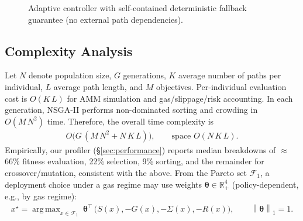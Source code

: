 \documentclass[11pt]{article}
\DeclareMathOperator*{\argmax}{arg\,max}
\newcommand{\R}{\mathbb{R}}
\newcommand{\1}{\mathbf{1}}  %
\newcommand{\norm}[1]{\left\lVert #1\right\rVert}
\begin{document}
\begin{figure}[t]
\centering
{}
\caption{Adaptive controller with self-contained deterministic fallback guarantee (no external path dependencies).}
\label{alg:hybrid}
\end{figure}

\subsection{Complexity Analysis}
Let $N$ denote population size, $G$ generations, $K$ average number of paths per individual, $L$ average path length, and $M$ objectives. Per-individual evaluation cost is $O(K\,L)$ for AMM simulation and gas/slippage/risk accounting. In each generation, NSGA-II performs non-dominated sorting and crowding in $O(M\,N^2)$ time. Therefore, the overall time complexity is
\begin{align}
  O\big(G\,(M\,N^2 + N\,K\,L)\big),\qquad \text{space } O(N\,K\,L).
\end{align}
Empirically, our profiler (\S\ref{sec:performance}) reports median breakdowns of $\approx$66\% fitness evaluation, 22\% selection, 9\% sorting, and the remainder for crossover/mutation, consistent with the above.
\;From the Pareto set $\mathcal{F}_1$, a deployment choice under a gas regime may use weights $\bm{\theta}\in\R_+^4$ (policy-dependent, e.g., by gas regime):
\begin{align}
 x^{\star} = \argmax_{x\in\mathcal{F}_1} \; \bm{\theta}^{\top}\,\big(S(x),-G(x),-\Sigma(x),-R(x)\big),\qquad \norm{\bm{\theta}}_1 = 1.
\end{align}
\end{document}
